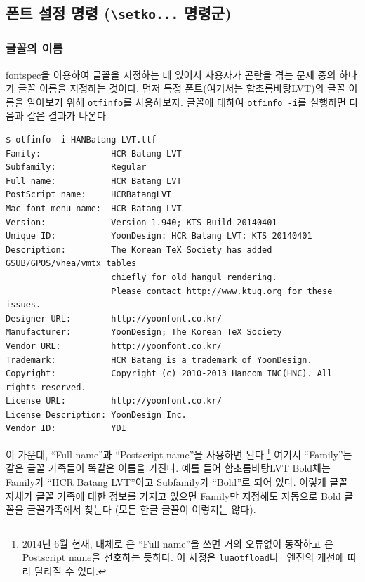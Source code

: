\documentclass[
	12pt,
	a4paper,
	kosection,
	footnote,
	nobookmarks,
	microtype,
	figtabcapt,
]{oblivoir}
\def\cs#1{\texttt{\textbackslash #1}}
\def\util#1{\texttt{#1}}
\def\ct#1{\texttt{#1}}
\newcommand\obclass{ob\-liv\-oir\oblivoirallowbreak}
\begin{document}
\subsection{ 폰트 설정 명령 (\protect\cs{setko...} 명령군)}

\subsubsection{글꼴의 이름}
fontspec을 이용하여 글꼴을 지정하는 데 있어서 사용자가 곤란을 겪는 문제 중의 하나가 글꼴 이름을 
지정하는 것이다. 먼저 특정 폰트(여기서는 함초롬바탕LVT)의 글꼴 이름을 알아보기 위해 \util{otfinfo}를
사용해보자. 글꼴에 대하여 \util{otfinfo -i}를 실행하면 다음과 같은 결과가 나온다.

\begin{footnotesize}
\begin{verbatim}
$ otfinfo -i HANBatang-LVT.ttf
Family:              HCR Batang LVT
Subfamily:           Regular
Full name:           HCR Batang LVT
PostScript name:     HCRBatangLVT
Mac font menu name:  HCR Batang LVT
Version:             Version 1.940; KTS Build 20140401
Unique ID:           YoonDesign: HCR Batang LVT: KTS 20140401
Description:         The Korean TeX Society has added GSUB/GPOS/vhea/vmtx tables 
                     chiefly for old hangul rendering. 
                     Please contact http://www.ktug.org for these issues.
Designer URL:        http://yoonfont.co.kr/
Manufacturer:        YoonDesign; The Korean TeX Society
Vendor URL:          http://yoonfont.co.kr/
Trademark:           HCR Batang is a trademark of YoonDesign.
Copyright:           Copyright (c) 2010-2013 Hancom INC(HNC). All rights reserved.
License URL:         http://yoonfont.co.kr/
License Description: YoonDesign Inc.
Vendor ID:           YDI
\end{verbatim}
\end{footnotesize}
이 가운데, ``Full name''과 ``Postscript name''을 사용하면 된다.\footnote{%
	2014년 6월 현재, 대체로 \XeTeX 은 ``Full name''을 쓰면 거의 오류없이 동작하고
	\LuaTeX 은 Postscript name을 선호하는 듯하다. 이 사정은 \ct{luaotfload}나
	\XeTeX\ 엔진의 개선에 따라 달라질 수 있다.}
여기서 ``Family''는 같은 글꼴 가족들이 똑같은 이름을 가진다. 예를 들어 함초롬바탕LVT Bold체는
Family가 ``HCR Batang LVT''이고 Subfamily가 ``Bold''로 되어 있다. 이렇게 글꼴 자체가 글꼴 가족에 대한 정보를 가지고 있으면 Family만 지정해도 자동으로 Bold 글꼴을 글꼴가족에서 찾는다 (모든 한글 글꼴이 이렇지는 않다).
\end{document}
